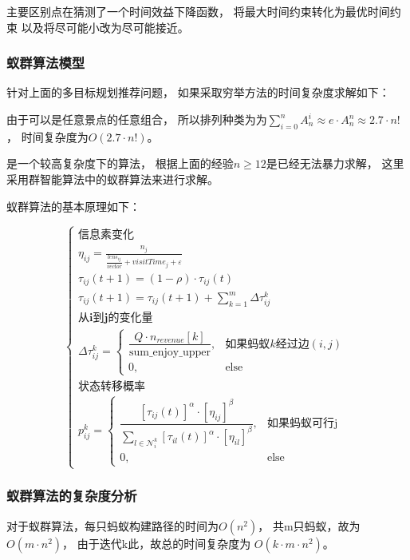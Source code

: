 \documentclass[withoutpreface,bwprint]{cumcmthesis} %
\begin{document}
主要区别点在猜测了一个时间效益下降函数，
将最大时间约束转化为最优时间约束
以及将尽可能小改为尽可能接近。


\subsubsection{蚁群算法模型}
针对上面的多目标规划推荐问题，
如果采取穷举方法的时间复杂度求解如下：

由于可以是任意景点的任意组合，
所以排列种类为为$\sum_{i=0}^{n} A_n^i\approx 
e\cdot A_n^n \approx 2.7\cdot n!$，
时间复杂度为$O(2.7 \cdot n!)$。

是一个较高复杂度下的算法，
根据上面的经验$n \geq 12$是已经无法暴力求解，
这里采用群智能算法中的蚁群算法来进行求解。

蚁群算法的基本原理如下：

\begin{equation}
    \begin{cases}
        \textbf{信息素变化} \\
        \eta_{ij} = \frac{n_j}{\frac{lens_{ij}}{vector} + visitTime_j + \varepsilon} \\
        \tau_{ij}(t+1) = (1 - \rho) \cdot \tau_{ij}(t) \\
        \tau_{ij}(t+1) = \tau_{ij}(t+1) + \sum_{k=1}^{m} \Delta\tau_{ij}^k \\
        \textbf{从i到j的变化量} \\
        \Delta\tau_{ij}^k = 
            \begin{cases}
            \dfrac{Q \cdot n_{revenue}[k]}{\text{sum\_enjoy\_upper}}, & \text{如果蚂蚁}k\text{经过边}(i,j)\\
            0, & \text{else}
            \end{cases} \\
        \textbf{状态转移概率} \\
        p_{ij}^k = 
            \begin{cases}
            \dfrac{[\tau_{ij}(t)]^\alpha \cdot [\eta_{ij}]^\beta}{\sum\limits_{l \in \mathcal{N}_i^k} [\tau_{il}(t)]^\alpha \cdot [\eta_{il}]^\beta}, & \text{如果蚂蚁可行j}\\
            0, & \text{else}
            \end{cases}
    \end{cases}
\end{equation}

\subsubsection{蚁群算法的复杂度分析}
对于蚁群算法，每只蚂蚁构建路径的时间为$O(n^2)$，
共m只蚂蚁，故为$O(m\cdot n^2)$，
由于迭代k此，故总的时间复杂度为
$O(k\cdot m \cdot n^2)$。
\end{document}
